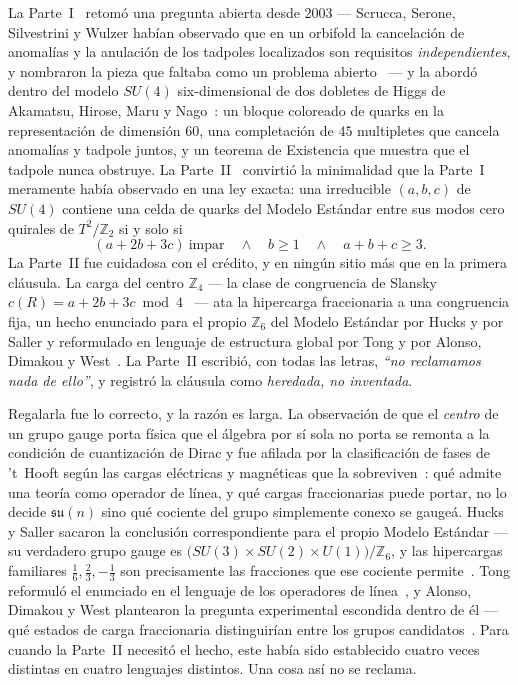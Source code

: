 \documentclass[11pt,a4paper]{article}
\newcommand{\ZZ}{\mathbb{Z}}
\begin{document}
La Parte~I~\cite{PartI} retomó una pregunta abierta desde 2003 --- Scrucca, Serone,
Silvestrini y Wulzer habían observado que en un orbifold la cancelación de anomalías y la
anulación de los tadpoles localizados son requisitos \emph{independientes}, y nombraron la
pieza que faltaba como un problema abierto~\cite{SSSW} --- y la abordó dentro del modelo
$SU(4)$ six-dimensional de dos dobletes de Higgs de Akamatsu, Hirose, Maru y
Nago~\cite{AHMN}: un bloque coloreado de quarks en la representación de dimensión $60$, una
completación de $45$ multipletes que cancela anomalías y tadpole juntos, y un teorema de
Existencia que muestra que el tadpole nunca obstruye. La Parte~II~\cite{PartII} convirtió la
minimalidad que la Parte~I meramente había observado en una ley exacta: una irreducible
$(a,b,c)$ de $SU(4)$ contiene una celda de quarks del Modelo Estándar entre sus modos cero
quirales de $T^2/\ZZ_2$ si y solo si
\begin{equation}\label{eq:criterion}
(a+2b+3c)\ \text{impar}\quad\wedge\quad b\ge1\quad\wedge\quad a+b+c\ge3 .
\end{equation}
La Parte~II fue cuidadosa con el crédito, y en ningún sitio más que en la primera cláusula.
La carga del centro $\ZZ_4$ --- la clase de congruencia de Slansky $c(R)=a+2b+3c \bmod
4$~\cite{Slansky} --- ata la hipercarga fraccionaria a una congruencia fija, un hecho
enunciado para el propio $\ZZ_6$ del Modelo Estándar por Hucks y por Saller y reformulado en
lenguaje de estructura global por Tong y por Alonso, Dimakou y
West~\cite{Hucks,Saller,Tong,Alonso}. La Parte~II escribió, con todas las letras, \emph{``no
reclamamos nada de ello''}, y registró la cláusula como \emph{heredada, no inventada}.

Regalarla fue lo correcto, y la razón es larga. La observación de que el \emph{centro} de un
grupo gauge porta física que el álgebra por sí sola no porta se remonta a la condición de
cuantización de Dirac y fue afilada por la clasificación de fases de 't~Hooft según las
cargas eléctricas y magnéticas que la sobreviven~\cite{tHooft}: qué admite una teoría como
operador de línea, y qué cargas fraccionarias puede portar, no lo decide $\mathfrak{su}(n)$
sino qué cociente del grupo simplemente conexo se gauge\'a. Hucks y Saller sacaron la
conclusión correspondiente para el propio Modelo Estándar --- su verdadero grupo gauge es
$\big(SU(3)\times SU(2)\times U(1)\big)/\ZZ_6$, y las hipercargas familiares
$\tfrac16,\tfrac23,-\tfrac13$ son precisamente las fracciones que ese cociente
permite~\cite{Hucks,Saller}. Tong reformuló el enunciado en el lenguaje de los operadores de
línea~\cite{Tong}, y Alonso, Dimakou y West plantearon la pregunta experimental escondida
dentro de él --- qué estados de carga fraccionaria distinguirían entre los grupos
candidatos~\cite{Alonso}. Para cuando la Parte~II necesitó el hecho, este había sido
establecido cuatro veces distintas en cuatro lenguajes distintos. Una cosa así no se reclama.
\end{document}
